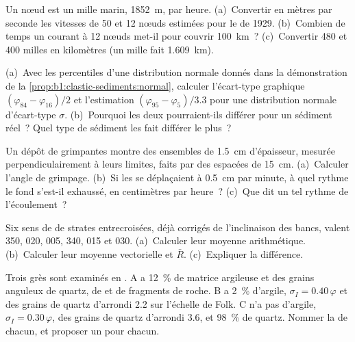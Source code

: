 \begin{exercise}[$\star$]\label{exo:b1:clastic-sediments:4}
Un nœud est un mille marin, \qty{1852}{m}, par heure. (a)~Convertir en mètres
par seconde les vitesses de 50 et 12 nœuds estimées pour le  de
1929. (b)~Combien de temps un courant à 12 nœuds met-il pour couvrir \qty{100}{km}~?
(c)~Convertir 480 et 400 milles en kilomètres (un mille fait \qty{1.609}{km}).
\end{exercise}

\begin{exercise}[$\star\star$]\label{exo:b1:clastic-sediments:5}
(a)~Avec les percentiles d'une distribution normale donnés dans la démonstration de la
\cref{prop:b1:clastic-sediments:normal}, calculer l'écart-type
graphique $(\varphi_{84} - \varphi_{16})/2$ et l'estimation
$(\varphi_{95} - \varphi_5)/3.3$ pour une distribution normale d'écart-type
$\sigma$. (b)~Pourquoi les deux pourraient-ils différer pour un sédiment réel~? Quel
type de sédiment les fait différer le plus~?
\end{exercise}

\begin{exercise}[$\star\star$]\label{exo:b1:clastic-sediments:6}
Un dépôt de  grimpantes montre des ensembles de \qty{1.5}{cm} d'épaisseur, mesurée
perpendiculairement à leurs limites, faits par des  espacées de \qty{15}{cm}.
(a)~Calculer l'angle de grimpage. (b)~Si les  se déplaçaient à
\qty{0.5}{cm} par minute, à quel rythme le fond s'est-il exhaussé, en centimètres par
heure~? (c)~Que dit un tel rythme de l'écoulement~?
\end{exercise}

\begin{exercise}[$\star\star$]\label{exo:b1:clastic-sediments:7}
Six sens de  de strates entrecroisées, déjà corrigés de l'inclinaison des bancs,
valent 350, 020, 005, 340, 015 et 030. (a)~Calculer leur moyenne arithmétique. (b)~Calculer
leur moyenne vectorielle et $\bar R$. (c)~Expliquer la différence.
\end{exercise}

\begin{exercise}[$\star\star$]\label{exo:b1:clastic-sediments:8}
Trois grès sont examinés en . A a \qty{12}{\percent} de
matrice argileuse et des grains anguleux de quartz, de  et de fragments de roche. B a
\qty{2}{\percent} d'argile, $\sigma_I = 0.40\,\varphi$ et des grains de quartz
d'arrondi \num{2.2} sur l'échelle de Folk. C n'a pas d'argile, $\sigma_I =
0.30\,\varphi$, des grains de quartz d'arrondi \num{3.6}, et \qty{98}{\percent}
de quartz. Nommer la  de chacun, et proposer un  pour chacun.
\end{exercise}

